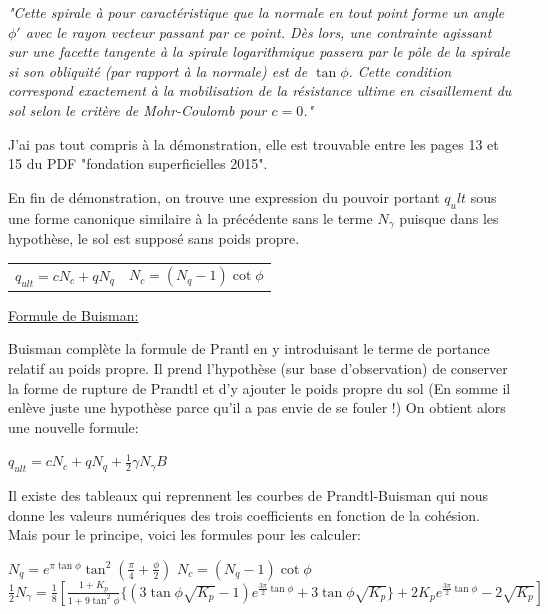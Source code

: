             \textit{"Cette spirale à pour caractéristique que la normale en tout point forme un angle $\phi'$ avec le rayon vecteur passant par ce point. Dès lors, une contrainte agissant sur une facette tangente à la spirale logarithmique passera par le pôle de la spirale si son obliquité (par rapport à la normale) est de $\tan \phi$. Cette condition correspond exactement à la mobilisation de la résistance ultime en cisaillement du sol selon le critère de Mohr-Coulomb pour $c=0$."}
            
            J'ai pas tout compris à la démonstration, elle est trouvable entre les pages 13 et 15 du PDF "fondation superficielles 2015".
            
            En fin de démonstration, on trouve une expression du pouvoir portant $q_ult$ sous une forme canonique similaire à la précédente sans le terme $N_{\gamma}$ puisque dans les hypothèse, le sol est supposé sans poids propre.
            
            \begin{center}
                \begin{tabular}{c|c}
                     $q_{ult} = c N_c + q N_q$ &  $N_c = (N_q - 1) \cot \phi$ \\   
                \end{tabular}
            \end{center} 
            
            \underline{Formule de Buisman:} 
            
            Buisman complète la formule de Prantl en y introduisant le terme de portance relatif au poids propre. Il prend l'hypothèse (sur base d'observation) de conserver la forme de rupture de Prandtl et d'y ajouter le poids propre du sol (En somme il enlève juste une hypothèse parce qu'il a pas envie de se fouler !) On obtient alors une nouvelle formule:
            
            \begin{center}
                $q_{ult} = c N_c + q N_q + \frac{1}{2} \gamma N_{\gamma} B$
            \end{center}
            
            Il existe des tableaux qui reprennent les courbes de Prandtl-Buisman qui nous donne les valeurs numériques des trois coefficients en fonction de la cohésion. Mais pour le principe, voici les formules pour les calculer:
            
            \begin{center}
                $N_q = e^{\pi \tan \phi} \tan^2(\frac{\pi}{4} + \frac{\phi}{2})$ 
                \medskip
                $N_c = (N_q - 1) \cot \phi$ 
                \medskip
                $\frac{1}{2} N_{\gamma} = \frac{1}{8}[\frac{1+K_p}{1+9 \tan^2 \phi} \{(3\tan \phi \sqrt{K_p}-1) e^{\frac{3\pi}{2} \tan \phi} + 3 \tan \phi \sqrt{K_p} \} + 2K_p e^{\frac{3\pi}{2} \tan \phi} - 2 \sqrt{K_p}]$
            \end{center}
            
